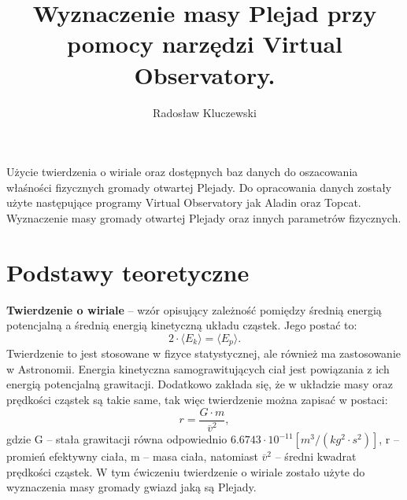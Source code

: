 \documentclass{aa}
\begin{document}
   \title{Wyznaczenie masy Plejad przy pomocy narzędzi Virtual Observatory.}
   \subtitle{}
   \author{Radosław Kluczewski }
\abstract
   {} 
   {Użycie twierdzenia o wiriale oraz dostępnych baz danych do oszacowania właśności fizycznych gromady otwartej Plejady.}
   {Do opracowania danych zostały użyte następujące programy Virtual Observatory jak Aladin oraz Topcat.}
   {Wyznaczenie masy gromady otwartej Plejady oraz innych parametrów fizycznych.}
   {}
   \keywords{}
\maketitle
\section{Podstawy teoretyczne}
\textbf{Twierdzenie o wiriale} -- wzór opisujący zależność pomiędzy średnią energią potencjalną a średnią energią kinetyczną układu cząstek. Jego postać to: %
\begin{equation}
    2 \cdot \langle E_k \rangle= \langle E_p \rangle.
\end{equation}
Twierdzenie to jest  stosowane w fizyce statystycznej, ale również ma zastosowanie w Astronomii. Energia kinetyczna samograwitujących ciał jest powiązania z ich energią potencjalną grawitacji. Dodatkowo zakłada się, że w układzie masy  oraz prędkości cząstek są takie same, tak więc twierdzenie można zapisać w postaci:
\begin{equation}
    r = \frac{G \cdot m}{\overline{v} ^ 2},
    \label{masa}
\end{equation}
gdzie G -- stała grawitacji równa odpowiednio $6.6743 \cdot 10 ^ {-11}\left [ m ^ 3 /(kg ^ 2 \cdot s ^ 2) \right ]$, r -- promień efektywny ciała, m -- masa ciała, natomiast $\overline{v} ^ 2$ -- średni kwadrat prędkości cząstek. W tym ćwiczeniu twierdzenie o wiriale zostało użyte do wyznaczenia masy gromady gwiazd jaką są Plejady.
\end{document}
